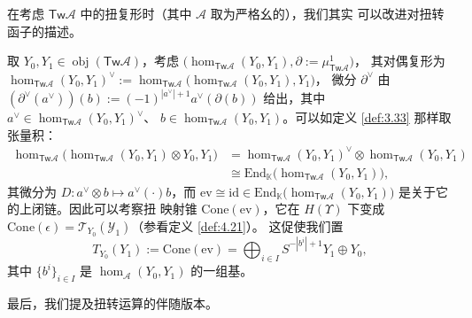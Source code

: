 \begin{Rem}\label{rem:4.25}
在考虑 $\mathsf{Tw}\mathcal A$ 中的扭复形时（其中 $\mathcal A$ 取为严格幺的），我们其实
可以改进对扭转函子的描述。

取 $Y_0,Y_1\in\operatorname{obj}(\mathsf{Tw}\mathcal A)$，考虑
$\bigl(\hom_{\mathsf{Tw}\mathcal A}(Y_0,Y_1),\partial:=\mu^1_{\mathsf{Tw}\mathcal A}\bigr)$，
其对偶复形为
$\hom_{\mathsf{Tw}\mathcal A}(Y_0,Y_1)^\vee:=
\hom_{\mathsf{Tw}\mathcal A}\bigl(\hom_{\mathsf{Tw}\mathcal A}(Y_0,Y_1),Y_1\bigr)$，
微分 $\partial^\vee$ 由
$(\partial^\vee(a^\vee))(b):=(-1)^{|a^\vee|+1}a^\vee(\partial(b))$ 给出，其中
$a^\vee\in\hom_{\mathsf{Tw}\mathcal A}(Y_0,Y_1)^\vee$、
$b\in\hom_{\mathsf{Tw}\mathcal A}(Y_0,Y_1)$。可以如定义 \ref{def:3.33} 那样取张量积：
\[
  \begin{aligned}
    \hom_{\mathsf{Tw}\mathcal A}\bigl(\hom_{\mathsf{Tw}\mathcal A}(Y_0,Y_1)
      \otimes Y_0,Y_1\bigr)
    &=\hom_{\mathsf{Tw}\mathcal A}(Y_0,Y_1)^\vee
      \otimes\hom_{\mathsf{Tw}\mathcal A}(Y_0,Y_1)\\
    &\cong\mathrm{End}_{\mathbb K}\bigl(\hom_{\mathsf{Tw}\mathcal A}(Y_0,Y_1)\bigr),
  \end{aligned}
\]
其微分为 $D:a^\vee\otimes b\mapsto a^\vee(\cdot)b$，而
$\mathrm{ev}\cong\mathrm{id}\in\mathrm{End}_{\mathbb K}
\bigl(\hom_{\mathsf{Tw}\mathcal A}(Y_0,Y_1)\bigr)$ 是关于它的上闭链。因此可以考察扭
映射锥 $\mathrm{Cone}(\mathrm{ev})$，它在 $H(\Upsilon)$ 下变成
$\mathrm{Cone}(\epsilon)=\mathcal T_{Y_0}(\mathcal Y_1)$（参看定义 \ref{def:4.21}）。
这促使我们置
\[
  T_{Y_0}(Y_1):=\mathrm{Cone}(\mathrm{ev})
  =\bigoplus_{i\in I}S^{-|b^i|+1}Y_1\oplus Y_0,
\]
其中 $\{b^i\}_{i\in I}$ 是 $\hom_{\mathcal A}(Y_0,Y_1)$ 的一组基。
\end{Rem}

最后，我们提及扭转运算的伴随版本。

